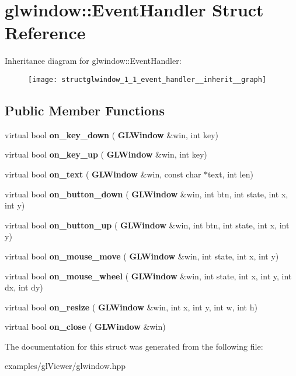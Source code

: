 \section{glwindow\+:\+:Event\+Handler Struct Reference}
\label{structglwindow_1_1_event_handler}


Inheritance diagram for glwindow\+:\+:Event\+Handler\+:\nopagebreak
\begin{figure}[H]
\begin{center}
\leavevmode
\texttt{[image: structglwindow\_1\_1\_event\_handler\_\_inherit\_\_graph]}
\end{center}
\end{figure}
\subsection*{Public Member Functions}
\begin{DoxyCompactItemize}
\item 
\mbox{\label{structglwindow_1_1_event_handler_a6f2084a1cbe2ec67360f07f7cacee5b8}} 
virtual bool {\bfseries on\+\_\+key\+\_\+down} (\textbf{ G\+L\+Window} \&win, int key)
\item 
\mbox{\label{structglwindow_1_1_event_handler_aed85ba8a37b8403ffe5d89ee5d2e765c}} 
virtual bool {\bfseries on\+\_\+key\+\_\+up} (\textbf{ G\+L\+Window} \&win, int key)
\item 
\mbox{\label{structglwindow_1_1_event_handler_a2dc8861119889a5ece73ffdb09439b18}} 
virtual bool {\bfseries on\+\_\+text} (\textbf{ G\+L\+Window} \&win, const char $\ast$text, int len)
\item 
\mbox{\label{structglwindow_1_1_event_handler_adeb34bb7c2eb4357496bf4d8fcda53df}} 
virtual bool {\bfseries on\+\_\+button\+\_\+down} (\textbf{ G\+L\+Window} \&win, int btn, int state, int x, int y)
\item 
\mbox{\label{structglwindow_1_1_event_handler_a2801b252ae6ddc96595bc262354ca789}} 
virtual bool {\bfseries on\+\_\+button\+\_\+up} (\textbf{ G\+L\+Window} \&win, int btn, int state, int x, int y)
\item 
\mbox{\label{structglwindow_1_1_event_handler_a5f016ad6546c1413845a1a3b6c66bad9}} 
virtual bool {\bfseries on\+\_\+mouse\+\_\+move} (\textbf{ G\+L\+Window} \&win, int state, int x, int y)
\item 
\mbox{\label{structglwindow_1_1_event_handler_ad6373a3f3dd084db5f100e4da12130b8}} 
virtual bool {\bfseries on\+\_\+mouse\+\_\+wheel} (\textbf{ G\+L\+Window} \&win, int state, int x, int y, int dx, int dy)
\item 
\mbox{\label{structglwindow_1_1_event_handler_a32a807fa383e8d0a7395fea38125ea91}} 
virtual bool {\bfseries on\+\_\+resize} (\textbf{ G\+L\+Window} \&win, int x, int y, int w, int h)
\item 
\mbox{\label{structglwindow_1_1_event_handler_a0bb4bf3ce84c596f781594219aad8198}} 
virtual bool {\bfseries on\+\_\+close} (\textbf{ G\+L\+Window} \&win)
\end{DoxyCompactItemize}


The documentation for this struct was generated from the following file\+:\begin{DoxyCompactItemize}
\item 
examples/gl\+Viewer/glwindow.\+hpp\end{DoxyCompactItemize}
